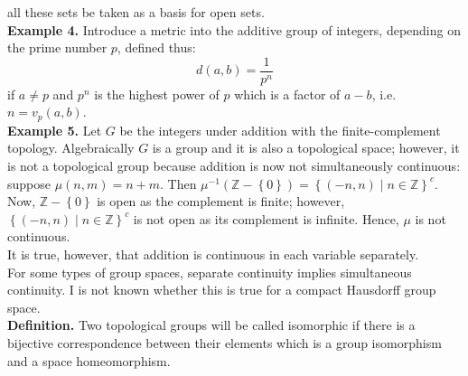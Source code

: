 \documentclass[a4paper]{article}
\theoremstyle{plain}%
\theoremstyle{definition}
\theoremstyle{remark}
\begin{document}
all these sets be taken as a basis for open sets.\\
\linebreak
\textbf{Example 4.} Introduce a metric into the additive group of integers,
depending on the prime number $p$, defined thus:
\[
d(a,b) = \frac{1}{p^{n}}
\] 
if $a\neq p$ and $p^{n}$ is the highest power of $p$ which is a factor of
$a-b$, i.e. $n = v_p(a,b)$.\\
\linebreak
\textbf{Example 5.} Let $G$ be the integers under addition with the
finite-complement topology. Algebraically $G$ is a group and it is also
a topological space; however, it is not a topological group because addition is
now not simultaneously continuous: suppose $\mu (n,m) = n+m$. Then
$\mu^{-1}\left( \mathbb{Z}- \left\{ 0 \right\}  \right) 
= \left\{ \left( -n,n \right)  \mid n \in \mathbb{Z} \right\}^{c}$. Now,
$\mathbb{Z} - \left\{ 0 \right\} $ is open as the complement is finite;
however,
$\left\{ \left( -n,n \right)  \mid n \in \mathbb{Z} \right\}^{c}$ is not open
as its complement is infinite. Hence, $\mu$ is not continuous.\\
It is true, however, that addition is continuous in each variable separately.\\
For some types of group spaces, separate continuity implies simultaneous
continuity. I is not known whether this is true for a compact Hausdorff group
space.\\
\linebreak
\textbf{Definition.} Two topological groups will be called isomorphic if there
is a bijective correspondence between their elements which is a group
isomorphism and a space homeomorphism.\\
\linebreak
\end{document}
